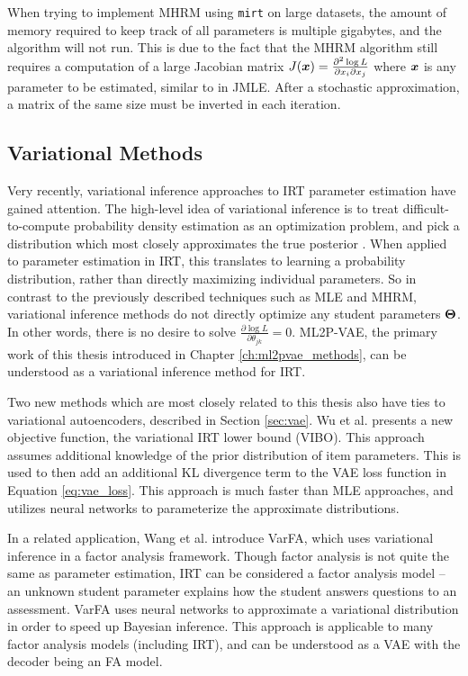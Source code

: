 When trying to implement MHRM using \verb!mirt! on large datasets, the amount of memory required to keep track of all parameters is multiple gigabytes, and the algorithm will not run. This is due to the fact that the MHRM algorithm still requires a computation of a large Jacobian matrix $J(\boldsymbol{x}) = \frac{\partial^2 \log L}{\partial x_i \partial x_j}$ where $\boldsymbol{x}$ is any parameter to be estimated, similar to in JMLE. After a stochastic approximation, a matrix of the same size must be inverted in each iteration. 

\subsection{Variational Methods}
Very recently, variational inference approaches to IRT parameter estimation have gained attention. The high-level idea of variational inference is to treat difficult-to-compute probability density estimation as an optimization problem, and pick a distribution which most closely approximates the true posterior \cite{Blei2017}. When applied to parameter estimation in IRT, this translates to learning a probability distribution, rather than directly maximizing individual parameters. So in contrast to the previously described techniques such as MLE and MHRM, variational inference methods do not directly optimize any student parameters $\boldsymbol{\Theta}$. In other words, there is no desire to solve $\frac{\partial \log L}{\partial \theta_{jk}} = 0$. ML2P-VAE, the primary work of this thesis introduced in Chapter \ref{ch:ml2pvae_methods}, can be understood as a variational inference method for IRT.

Two new methods which are most closely related to this thesis also have ties to variational autoencoders, described in Section \ref{sec:vae}. Wu et al. \cite{wu2020} presents a new objective function, the variational IRT lower bound (VIBO). This approach assumes additional knowledge of the prior distribution of item parameters. This is used to then add an additional KL divergence term to the VAE loss function in Equation \ref{eq:vae_loss}. This approach is much faster than MLE approaches, and utilizes neural networks to parameterize the approximate distributions.

In a related application, Wang et al. \cite{wang2020} introduce VarFA, which uses variational inference in a factor analysis framework. Though factor analysis is not quite the same as parameter estimation, IRT can be considered a factor analysis model -- an unknown student parameter explains how the student answers questions to an assessment. VarFA uses neural networks to approximate a variational distribution in order to speed up Bayesian inference. This approach is applicable to many factor analysis models (including IRT), and can be understood as a VAE with the decoder being an FA model.



